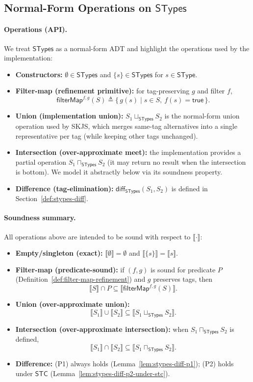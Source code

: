\documentclass[11pt]{article}
\newcommand{\sem}[1]{\llbracket #1 \rrbracket}
\newcommand{\diff}{\mathsf{diff}}
\newcommand{\SType}{\mathsf{SType}}
\newcommand{\STypes}{\mathsf{STypes}}
\begin{document}
\subsection{Normal-Form Operations on $\STypes$}
\label{sec:stypes-ops}

\paragraph{Operations (API).}
We treat \(\STypes\) as a normal-form ADT and highlight the operations used by the implementation:
\begin{itemize}
\item \textbf{Constructors:} \(\emptyset \in \STypes\) and \(\{s\} \in \STypes\) for \(s\in\SType\).
\item \textbf{Filter-map (refinement primitive):} for tag-preserving \(g\) and filter \(f\),
\[
\mathsf{filterMap}^{f,g}(S) \triangleq \{\, g(s) \mid s \in S,\ f(s)=\mathsf{true}\,\}.
\]
\item \textbf{Union (implementation union):} \(S_1 \sqcup_{\STypes} S_2\) is the normal-form union operation used by SKJS, which merges same-tag alternatives into a single representative per tag (while keeping other tags unchanged).
\item \textbf{Intersection (over-approximate meet):} the implementation provides a partial operation \(S_1 \sqcap_{\STypes} S_2\) (it may return no result when the intersection is bottom). We model it abstractly below via its soundness property.
\item \textbf{Difference (tag-elimination):} \(\diff_{\STypes}(S_1,S_2)\) is defined in Section~\ref{def:stypes-diff}.
\end{itemize}

\paragraph{Soundness summary.}
All operations above are intended to be sound with respect to \(\sem{\cdot}\):
\begin{itemize}
\item \textbf{Empty/singleton (exact):} \(\sem{\emptyset}=\emptyset\) and \(\sem{\{s\}}=\sem{s}\).
\item \textbf{Filter-map (predicate-sound):} if \((f,g)\) is sound for predicate \(P\) (Definition~\ref{def:filter-map-refinement}) and \(g\) preserves tags, then
\[
\sem{S} \cap P \subseteq \sem{\mathsf{filterMap}^{f,g}(S)}.
\]
\item \textbf{Union (over-approximate union):}
\[
\sem{S_1} \cup \sem{S_2} \subseteq \sem{S_1 \sqcup_{\STypes} S_2}.
\]
\item \textbf{Intersection (over-approximate intersection):} when \(S_1 \sqcap_{\STypes} S_2\) is defined,
\[
\sem{S_1} \cap \sem{S_2} \subseteq \sem{S_1 \sqcap_{\STypes} S_2}.
\]
\item \textbf{Difference:} (P1) always holds (Lemma~\ref{lem:stypes-diff-p1}); (P2) holds under \(\mathsf{STC}\) (Lemma~\ref{lem:stypes-diff-p2-under-stc}).
\end{itemize}
\end{document}
